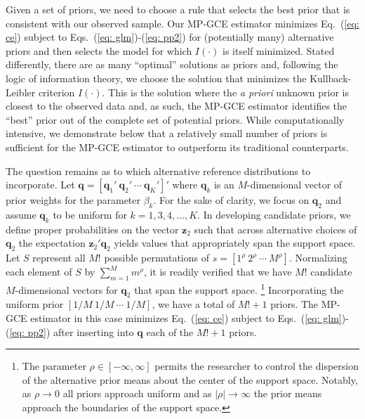 \documentclass{elsarticle}
\begin{document}
Given a set of priors, we need to choose a rule that selects the best prior that is 
consistent with our observed sample. 
Our MP-GCE estimator minimizes Eq.\ (\ref{eq: ce}) subject to Eqs.\ (\ref{eq: glm})-(\ref{eq: pp2}) 
for (potentially many) alternative priors and then selects the model for 
which $I(\cdot)$ is itself minimized. 
Stated differently, there are as many ``optimal'' solutions as priors and, following the logic 
of information theory, we choose the solution that minimizes the Kullback-Leibler criterion 
$I(\cdot)$. 
This is the solution where the \emph{a priori} unknown prior is closest to the observed 
data and, as such, the MP-GCE estimator identifies the ``best'' prior out of the complete 
set of potential priors. 
While computationally intensive, we demonstrate below that a relatively small 
number of priors is sufficient for the MP-GCE estimator to outperform its 
traditional counterparts.

The question remains as to which alternative reference distributions to 
incorporate.
Let $\mathbf{q}=[\mathbf{q}_1' ~ \mathbf{q}_2' ~ \cdots ~ \mathbf{q}_K' ]'$ where
$\mathbf{q}_k$ is an $M$-dimensional vector of prior weights for the parameter 
$\beta_k$.
For the sake of clarity, we focus on $\mathbf{q}_2$ and assume $\mathbf{q}_k$ to 
be uniform for $k=1,3,4,\ldots, K$.
In developing candidate priors, we define proper probabilities on the vector 
$\mathbf{z}_2$ such that across alternative choices of $\mathbf{q}_2$ the 
expectation $\mathbf{z}_2'\mathbf{q}_2$  yields values that appropriately
span the support space. 
Let $S$ represent all  $M!$ possible permutations of 
$s = [1^\rho ~ 2^\rho ~ \cdots ~ M^\rho]$.
Normalizing each element of $S$ by $\sum_{m=1}^M m^\rho$, it is 
readily verified that we have $M!$ candidate $M$-dimensional vectors for 
$\mathbf{q}_2$ that span the support space.%
\footnote{The parameter $\rho \in [-\infty, \infty]$ permits the researcher
to control the dispersion of the alternative prior means about the center of the 
support space.
Notably, as $\rho \to 0$ all priors approach uniform and as $|\rho| \to 
\infty$ the prior means approach the boundaries of the support space.}
Incorporating the uniform prior $[1/M ~ 1/M ~ \cdots ~ 1/M]$, we have a total
of $M! + 1$ priors.
The MP-GCE estimator in this case minimizes Eq.\ (\ref{eq: ce}) subject 
to Eqs.\ (\ref{eq: glm})-(\ref{eq: pp2}) after inserting into $\mathbf{q}$ 
each of the $M! + 1$ priors.

\end{document}

